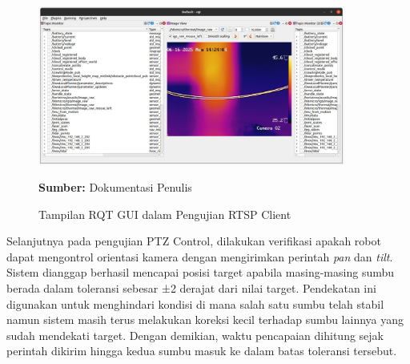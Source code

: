 \begin{figure}[H]
	\centering
	\includegraphics[width=0.9\textwidth]{gambar/bab4/test_rtsp.jpeg}
	\caption{Tampilan RQT GUI dalam Pengujian RTSP Client}
	\label{fig:rtsp_client} \footnotesize{\textbf{Sumber:} Dokumentasi Penulis}
\end{figure}

Selanjutnya pada pengujian PTZ Control, dilakukan verifikasi apakah robot dapat
mengontrol orientasi kamera dengan mengirimkan perintah \emph{pan} dan \emph{tilt}.
Sistem dianggap berhasil mencapai posisi target apabila masing-masing sumbu berada
dalam toleransi sebesar ±2 derajat dari nilai target. Pendekatan ini digunakan
untuk menghindari kondisi di mana salah satu sumbu telah stabil namun sistem
masih terus melakukan koreksi kecil terhadap sumbu lainnya yang sudah mendekati
target. Dengan demikian, waktu pencapaian dihitung sejak perintah dikirim hingga
kedua sumbu masuk ke dalam batas toleransi tersebut.

